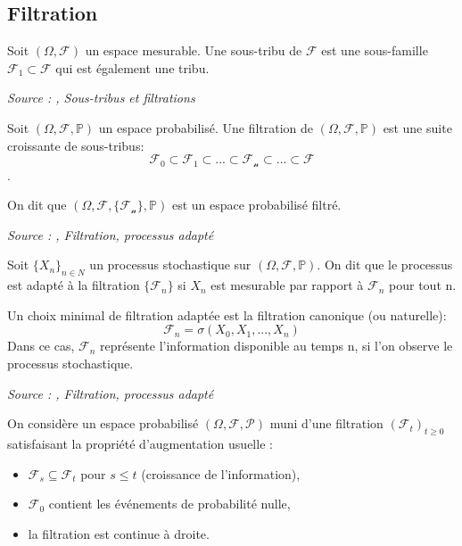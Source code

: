 \subsection{Filtration}

\begin{definition}\label{def:sous_tribu}
Soit $(\Omega, \mathcal{F})$ un espace mesurable. Une sous-tribu de $\mathcal{F}$ est une sous-famille $\mathcal{F_1} \subset \mathcal{F}$ qui est également une tribu.

\noindent\textit{Source : \cite{martingale_calcul_stochastique},  Sous-tribus et filtrations}
\end{definition}

\begin{definition}\label{def:filtration}
Soit $(\Omega, \mathcal{F}, \mathbb{P})$ un espace probabilisé. Une filtration de $(\Omega, \mathcal{F}, \mathbb{P})$ est une suite croissante de sous-tribus:
$$\mathcal{F_0} \subset \mathcal{F_1} \subset ... \subset \mathcal{F_n} \subset ... \subset \mathcal{F}$$.

On dit que $(\Omega, \mathcal{F}, \{\mathcal{F_n}\}, \mathbb{P})$ est un espace probabilisé filtré.

\noindent\textit{Source : \cite{martingale_calcul_stochastique},  Filtration, processus adapté}
\end{definition}

\begin{definition}\label{def:filtration_adaptée}
Soit $\{X_n\}_{n \in N}$ un processus stochastique sur $(\Omega, \mathcal{F}, \mathbb{P})$. On dit que le processus est
adapté à la filtration $\{\mathcal{F}_n\}$ si $X_n$ est mesurable par rapport à $\mathcal{F}_n$ pour tout n.

Un choix minimal de filtration adaptée est la filtration canonique (ou naturelle):
$$\mathcal{F}_n = \sigma(X_0, X_1, ..., X_n)$$
Dans ce cas, $\mathcal{F}_n$ représente l’information disponible au temps n, si l’on observe le processus stochastique.

\noindent\textit{Source : \cite{martingale_calcul_stochastique},  Filtration, processus adapté}
\end{definition}


On considère un espace probabilisé $(\Omega, \mathcal{F}, \mathcal{P})$ muni d'une filtration $(\mathcal{F}_t)_{t \ge 0}$ satisfaisant la propriété d'augmentation usuelle :
\begin{itemize}
  \item $\mathcal{F}_s \subseteq \mathcal{F}_t$ pour $s \le t$ (croissance de l'information),
  \item $\mathcal{F}_0$ contient les événements de probabilité nulle,
  \item la filtration est continue à droite.
\end{itemize}


